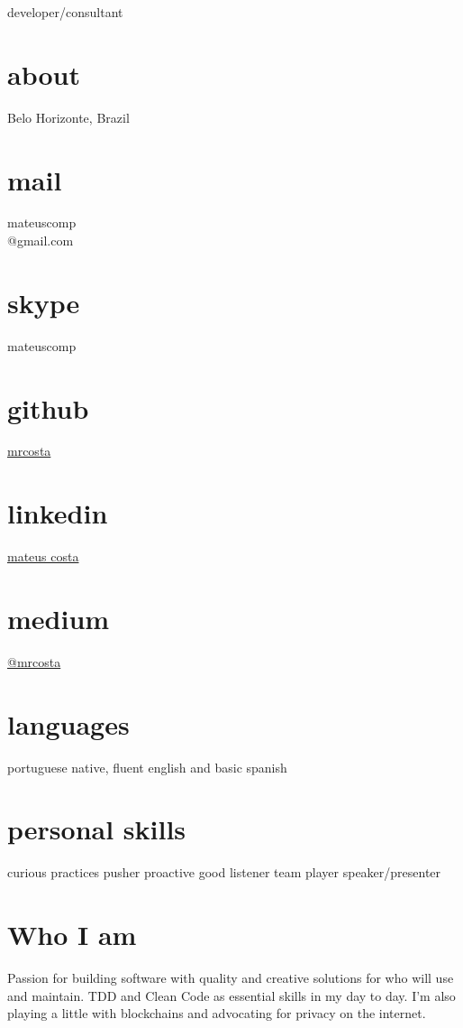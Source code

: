 \documentclass[]{friggeri-cv}
\begin{document}
       {developer/consultant}

\begin{aside}
  \section{about}
    \large Belo Horizonte, Brazil
  \section{mail}
    mateuscomp\\@gmail.com 
  \section{skype}
    mateuscomp
  \section{github}
    \href{https://github.com/mrcosta}{mrcosta}
  \section{linkedin}
    \href{www.linkedin.com/in/mateusrodriguescosta}{mateus costa}
  \section{medium}
    \href{https://medium.com/@mrcosta}{@mrcosta}
  \section{languages}
    portuguese native,
    fluent english and basic spanish
  \section{personal skills}
    curious
    practices pusher
    proactive
    good listener
    team player
    speaker/presenter
\end{aside}

\section{Who I am}
\begin{normalfont}
Passion for building software with quality and creative solutions for who will use and maintain. TDD and Clean Code as essential skills in my day to day. I'm also playing a little with blockchains and advocating for privacy on the internet.
\end{normalfont}
\end{document}
